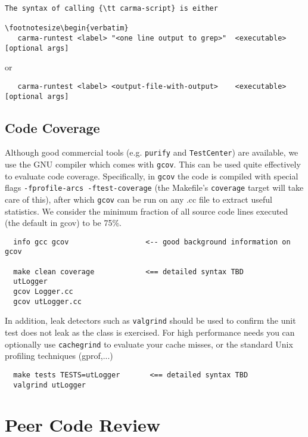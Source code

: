 \documentclass{article}
\begin{document}
\footnotesize\begin{verbatim}



The syntax of calling {\tt carma-script} is either

\footnotesize\begin{verbatim}
   carma-runtest <label> "<one line output to grep>"  <executable> [optional args]
\end{verbatim}\normalsize
or
\footnotesize\begin{verbatim}
   carma-runtest <label> <output-file-with-output>    <executable> [optional args]
\end{verbatim}\normalsize

\subsection{Code Coverage}

Although good commercial tools (e.g. {\tt purify} and {\tt TestCenter}) are available,
we use the GNU compiler which comes with {\tt gcov}.
This can be used quite effectively to evaluate code coverage. 
Specifically, in {\tt gcov} the code is compiled with special flags
{\tt -fprofile-arcs -ftest-coverage} (the Makefile's {\tt coverage} target
will take care of this), after which {\tt gcov} can be run on any 
.cc file to extract useful statistics. We consider the minimum fraction of all
source code lines executed (the default in gcov) to be 75\%.
\footnotesize
\begin{verbatim}
  info gcc gcov                  <-- good background information on gcov

  make clean coverage            <== detailed syntax TBD
  utLogger
  gcov Logger.cc
  gcov utLogger.cc
\end{verbatim}
\normalsize

In addition, leak detectors such as {\tt valgrind} should be used to confirm 
the unit test does not leak as the class is exercised. For high performance needs you
can optionally use {\tt cachegrind} to evaluate your cache misses, or
the standard Unix profiling techniques (gprof,...)
\footnotesize
\begin{verbatim}
  make tests TESTS=utLogger       <== detailed syntax TBD
  valgrind utLogger
\end{verbatim}
\normalsize


\section{Peer Code Review}
\end{document}
